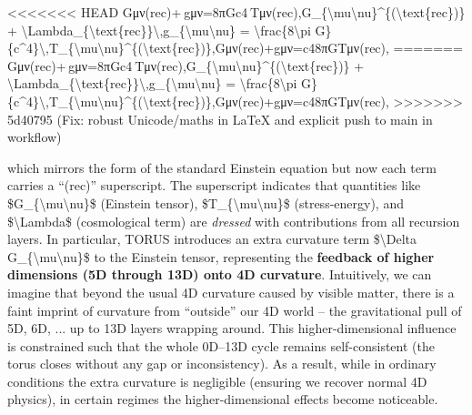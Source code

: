 \documentclass[]{article}
\begin{document}
<<<<<<< HEAD
Gμν(rec)+\Lambdarec gμν=8πGc4 Tμν(rec),G\_\{\textbackslash mu\textbackslash nu\}\^{}\{(\textbackslash text\{rec\})\}
+
\textbackslash Lambda\_\{\textbackslash text\{rec\}\}\textbackslash,g\_\{\textbackslash mu\textbackslash nu\}
= \textbackslash frac\{8\textbackslash pi
G\}\{c\^{}4\}\textbackslash,T\_\{\textbackslash mu\textbackslash nu\}\^{}\{(\textbackslash text\{rec\})\},Gμν(rec)\hspace{0pt}+\Lambdarec\hspace{0pt}gμν\hspace{0pt}=c48πG\hspace{0pt}Tμν(rec)\hspace{0pt},
=======
Gμν(rec)+\Lambdarec gμν=8πGc4 Tμν(rec),G\_\{\textbackslash{}mu\textbackslash{}nu\}\^{}\{(\textbackslash{}text\{rec\})\}
+
\textbackslash{}Lambda\_\{\textbackslash{}text\{rec\}\}\textbackslash{},g\_\{\textbackslash{}mu\textbackslash{}nu\}
= \textbackslash{}frac\{8\textbackslash{}pi
G\}\{c\^{}4\}\textbackslash{},T\_\{\textbackslash{}mu\textbackslash{}nu\}\^{}\{(\textbackslash{}text\{rec\})\},Gμν(rec)​+\Lambdarec​gμν​=c48πG​Tμν(rec)​,
>>>>>>> 5d40795 (Fix: robust Unicode/maths in LaTeX and explicit push to main in workflow)

which mirrors the form of the standard Einstein equation but now each
term carries a ``(rec)'' superscript​. The superscript indicates that
quantities like \$G\_\{\textbackslash{}mu\textbackslash{}nu\}\$
(Einstein tensor), \$T\_\{\textbackslash{}mu\textbackslash{}nu\}\$
(stress-energy), and \$\textbackslash{}Lambda\$ (cosmological term) are
\emph{dressed} with contributions from all recursion layers​. In
particular, TORUS introduces an extra curvature term
\$\textbackslash{}Delta G\_\{\textbackslash{}mu\textbackslash{}nu\}\$ to
the Einstein tensor, representing the \textbf{feedback of higher
dimensions (5D through 13D) onto 4D curvature}​. Intuitively, we can
imagine that beyond the usual 4D curvature caused by visible matter,
there is a faint imprint of curvature from ``outside'' our 4D world --
the gravitational pull of 5D, 6D, ... up to 13D layers wrapping around.
This higher-dimensional influence is constrained such that the whole
0D--13D cycle remains self-consistent (the torus closes without any gap
or inconsistency). As a result, while in ordinary conditions the extra
curvature is negligible (ensuring we recover normal 4D physics), in
certain regimes the higher-dimensional effects become noticeable.
\end{document}
